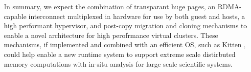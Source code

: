 In summary, we expect the combination of transparant huge pages, an RDMA-capable interconnect multiplexed in hardware for use by both guest and hosts, a high performant hypervisor, and post-copy migration and cloning mechanisms to enable a novel architecture for high perofrmance virtual clusters. These mechanisms, if implemented and combined with an efficient OS, such as Kitten \cite{pedretti2011kitten}, could help enable a new runtime system to support extreme scale distirbuted memory computations with in-situ analysis \cite{ahrens2010visualization, vishwanath2011toward} for large scale scientific systems. 




